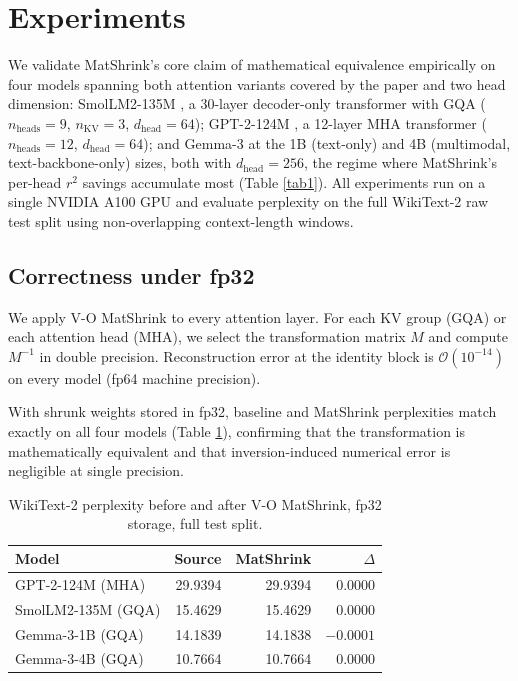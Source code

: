 \documentclass{article}
\begin{document}
\section{Experiments} \label{sec:experiments}
We validate MatShrink's core claim of mathematical equivalence empirically on four models spanning both attention variants covered by the paper and two head dimension: SmolLM2-135M \citep{smollm}, a 30-layer decoder-only transformer with GQA ($n_\text{heads} = 9$, $n_\text{KV} = 3$, $d_\text{head} = 64$); GPT-2-124M \citep{gpt2}, a 12-layer MHA transformer ($n_\text{heads} = 12$, $d_\text{head} = 64$); and Gemma-3 \citep{gemma3} at the 1B (text-only) and 4B (multimodal, text-backbone-only) sizes, both with $d_\text{head} = 256$, the regime where MatShrink's per-head $r^2$ savings accumulate most (Table \ref{tab1}). All experiments run on a single NVIDIA A100 GPU and evaluate perplexity on the full WikiText-2 raw test split using non-overlapping context-length windows.

\subsection{Correctness under fp32}
We apply V-O MatShrink to every attention layer. For each KV group (GQA) or each attention head (MHA), we select the transformation matrix $M$ and compute $M^{-1}$ in double precision. Reconstruction error at the identity block is $\mathcal{O}(10^{-14})$ on every model (fp64 machine precision).

With shrunk weights stored in fp32, baseline and MatShrink perplexities match exactly on all four models (Table \ref{tab:matshrink-correctness}), confirming that the transformation is mathematically equivalent and that inversion-induced numerical error is negligible at single precision.

\begin{table}[h!] \centering
\caption{WikiText-2 perplexity before and after V-O MatShrink, fp32 storage, full test split.}
\label{tab:matshrink-correctness}
\begin{tabular}{l r r r}
\hline
Model & Source & MatShrink & $\Delta$ \\
\hline
GPT-2-124M (MHA)     & 29.9394 & 29.9394 & 0.0000 \\
SmolLM2-135M (GQA)   & 15.4629 & 15.4629 & 0.0000 \\
Gemma-3-1B (GQA)     & 14.1839 & 14.1838 & $-0.0001$ \\
Gemma-3-4B (GQA)     & 10.7664 & 10.7664 & 0.0000 \\
\hline
\end{tabular}
\end{table}
\end{document}

